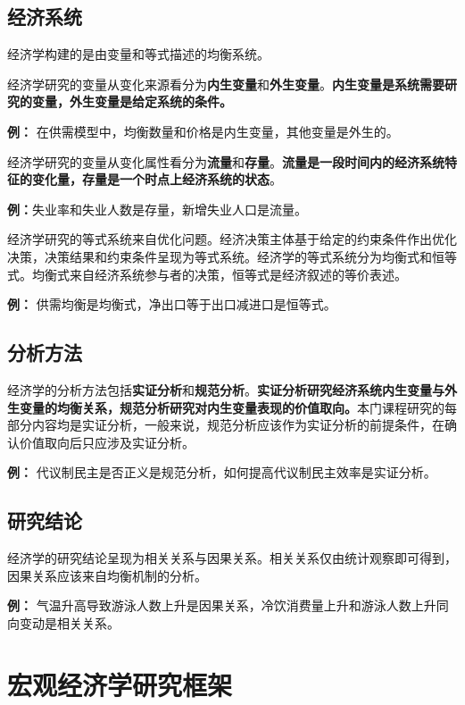 \documentclass[
  11pt,
  letterpaper,
]{ctexbook}
\begin{document}
\subsection{经济系统}\label{ux7ecfux6d4eux7cfbux7edf}

经济学构建的是由变量和等式描述的均衡系统。

经济学研究的变量从变化来源看分为\textbf{内生变量}和\textbf{外生变量}。\textbf{内生变量是系统需要研究的变量，外生变量是给定系统的条件。}

\textbf{例：} 在供需模型中，均衡数量和价格是内生变量，其他变量是外生的。

经济学研究的变量从变化属性看分为\textbf{流量}和\textbf{存量}。\textbf{流量是一段时间内的经济系统特征的变化量，存量是一个时点上经济系统的状态}。

\textbf{例：}失业率和失业人数是存量，新增失业人口是流量。

经济学研究的等式系统来自优化问题。经济决策主体基于给定的约束条件作出优化决策，决策结果和约束条件呈现为等式系统。经济学的等式系统分为均衡式和恒等式。均衡式来自经济系统参与者的决策，恒等式是经济叙述的等价表述。

\textbf{例：} 供需均衡是均衡式，净出口等于出口减进口是恒等式。

\subsection{分析方法}\label{ux5206ux6790ux65b9ux6cd5}

经济学的分析方法包括\textbf{实证分析}和\textbf{规范分析}。\textbf{实证分析研究经济系统内生变量与外生变量的均衡关系，规范分析研究对内生变量表现的价值取向。}本门课程研究的每部分内容均是实证分析，一般来说，规范分析应该作为实证分析的前提条件，在确认价值取向后只应涉及实证分析。

\textbf{例：}
代议制民主是否正义是规范分析，如何提高代议制民主效率是实证分析。

\subsection{研究结论}\label{ux7814ux7a76ux7ed3ux8bba}

经济学的研究结论呈现为相关关系与因果关系。相关关系仅由统计观察即可得到，因果关系应该来自均衡机制的分析。

\textbf{例：}
气温升高导致游泳人数上升是因果关系，冷饮消费量上升和游泳人数上升同向变动是相关关系。

\section{宏观经济学研究框架}\label{ux5b8fux89c2ux7ecfux6d4eux5b66ux7814ux7a76ux6846ux67b6}
\end{document}
